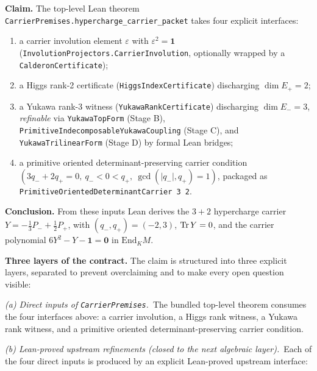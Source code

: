 \documentclass[11pt,a4paper]{article}
\begin{document}
\begin{tfptclaimcontract}
\textbf{Claim.}
The top-level Lean theorem
\texttt{CarrierPremises.hypercharge\_carrier\_packet} takes
four explicit interfaces:

\begin{enumerate}[leftmargin=1.5em, itemsep=0pt, label=(\arabic*)]
\item a carrier involution element $\varepsilon$ with
      $\varepsilon^2 = \mathbf 1$
      (\texttt{InvolutionProjectors.CarrierInvolution}, optionally
      wrapped by a \texttt{CalderonCertificate});
\item a Higgs rank-2 certificate
      (\texttt{HiggsIndexCertificate}) discharging $\dim E_+ = 2$;
\item a Yukawa rank-3 witness
      (\texttt{YukawaRankCertificate}) discharging $\dim E_- = 3$,
      \emph{refinable} via \texttt{YukawaTopForm} (Stage B),
      \texttt{PrimitiveIndecomposableYukawaCoupling} (Stage C),
      and \texttt{YukawaTrilinearForm} (Stage D) by formal Lean
      bridges;
\item a primitive oriented determinant-preserving carrier
      condition
      $(3 q_- + 2 q_+ = 0,\ q_- < 0 < q_+,\ \gcd(|q_-|,q_+) = 1)$,
      packaged as
      \texttt{PrimitiveOrientedDeterminantCarrier 3 2}.
\end{enumerate}

\textbf{Conclusion.}
From these inputs Lean derives the $3+2$ hypercharge carrier
$Y = -\tfrac13 P_- + \tfrac12 P_+$, with $(q_-,q_+) = (-2, 3)$,
$\operatorname{Tr} Y = 0$, and the carrier polynomial
$6 Y^2 - Y - \mathbf 1 = \mathbf 0$ in $\mathrm{End}_K M$.

\textbf{Three layers of the contract.}
The claim is structured into three explicit layers, separated to
prevent overclaiming and to make every open question visible:

\smallskip
\noindent
\emph{(a) Direct inputs of \texttt{CarrierPremises}.}\ The
bundled top-level theorem consumes the four interfaces above:
a carrier involution, a Higgs rank witness, a Yukawa rank
witness, and a primitive oriented determinant-preserving
carrier condition.

\smallskip
\noindent
\emph{(b) Lean-proved upstream refinements (closed to the
next algebraic layer).}\ Each of the four direct inputs is
produced by an explicit Lean-proved upstream interface:


\end{tfptclaimcontract}
\end{document}
